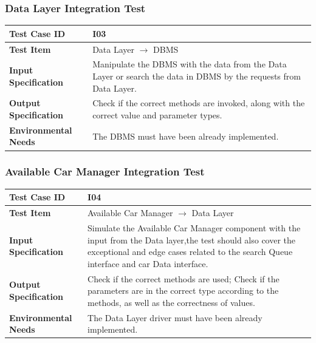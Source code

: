 \documentclass[a4paper,11pt]{article}
\begin{document}
		\subsubsection{Data Layer Integration Test}
\begin{table}[H] 
\begin{center}
\renewcommand\arraystretch{1.5}
\begin{tabular}{|p{5cm}|p{7cm}|}
 \hline
\textbf{Test Case ID}& I03\\
 \hline
\textbf{Test Item}&Data Layer $\rightarrow$ DBMS\\
 \hline
\textbf{Input Specification}&Manipulate the DBMS with the data from the Data Layer or search the data in DBMS by the requests from Data Layer.\\
 \hline
\textbf{Output Specification}&Check if the correct methods are invoked, along with the correct value and parameter types.\\
 \hline
 \textbf{Environmental Needs}&The DBMS must have been already implemented.\\
 \hline
\end{tabular}
\end{center}
\end{table}		
		\subsubsection{Available Car Manager Integration Test}
		\begin{table}[H] 
\begin{center}
\renewcommand\arraystretch{1.5}
\begin{tabular}{|p{5cm}|p{7cm}|}
 \hline
\textbf{Test Case ID}& I04\\
 \hline
\textbf{Test Item}&Available Car Manager $\rightarrow$ Data Layer\\
 \hline
\textbf{Input Specification}&Simulate the Available Car Manager component with the input from the Data layer,the test should also cover the exceptional and edge cases related to the search Queue interface and car Data interface.\\
 \hline
\textbf{Output Specification}&Check if the correct methods are used;
Check if the parameters are in the correct type according to the methods, as well as the correctness of values.\\
 \hline
 \textbf{Environmental Needs}&The Data Layer driver must have been already implemented.\\
 \hline
\end{tabular}
\end{center}
\end{table}		
\end{document}
